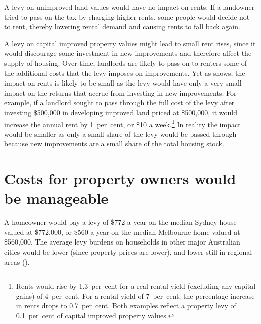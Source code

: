 \documentclass[twoside,english]{Dianab5ona4portrait}
\begin{document}
A levy on unimproved land values would have no impact on rents. If a landowner tried to pass on the tax by charging higher rents, some people would decide not to rent, thereby lowering rental demand and causing rents to fall back again.

A levy on capital improved property values might lead to small rent rises, since it would discourage some investment in new improvements and therefore affect the supply of housing. Over time, landlords are likely to pass on to renters some of the additional costs that the levy imposes on improvements. Yet as  shows, the impact on rents is likely to be small as the levy would have only a very small impact on the returns that accrue from investing in new improvements. For example, if a landlord sought to pass through the full cost of the levy after investing \$500,000 in developing improved land priced at \$500,000, it would increase the annual rent by 1~per~cent, or \$10 a week.\footnote{Rents would rise by 1.3~per~cent for a real rental yield (excluding any capital gains) of 4~per~cent. For a rental yield of 7~per~cent, the percentage increase in rents drops to 0.7~per~cent. Both examples reflect a property levy of 0.1~per~cent of capital improved property values.}  In reality the impact would be smaller as only a small share of the levy would be passed through because new improvements are a small share of the total housing stock.

\section{Costs for property owners would be manageable}
A homeowner would pay a levy of \$772 a year on the median Sydney house valued at \$772,000, or \$560 a year on the median Melbourne home valued at \$560,000. The average levy burdens on households in other major Australian cities would be lower (since property prices are lower), and lower still in regional areas ().
\end{document}

